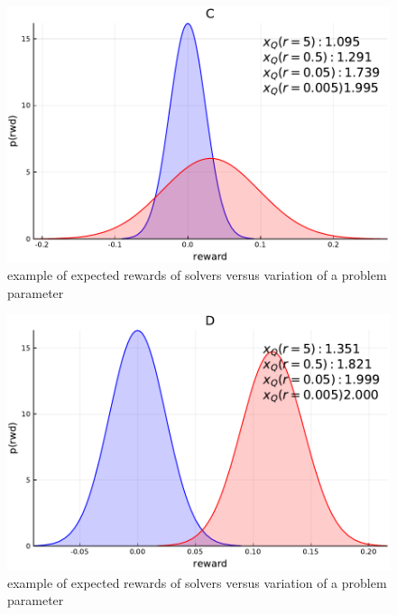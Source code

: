 \begin{figure}[tbp]
    \centering
    \includegraphics[width=0.9\linewidth]{Figures/p4}
    \caption{example of expected rewards of solvers versus variation of a problem parameter}
    \label{fig:sq_thry4}
\end{figure}
\begin{figure}[tbp]
    \centering
    \includegraphics[width=0.9\linewidth]{Figures/p5}
    \caption{example of expected rewards of solvers versus variation of a problem parameter}
    \label{fig:sq_thry5}
\end{figure}
